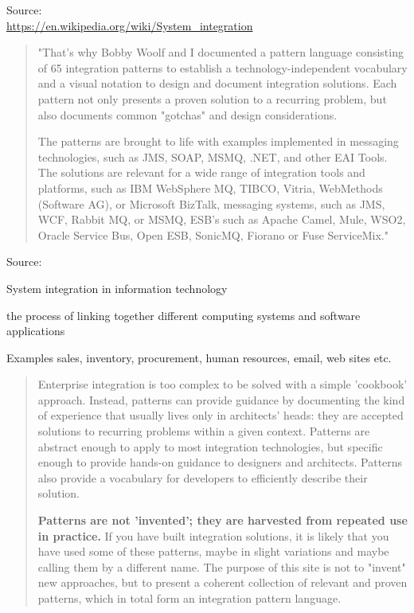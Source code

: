 \documentclass[Screen16to9,17pt]{foils}
\begin{document}
Source:\\
\url{https://en.wikipedia.org/wiki/System_integration}



\begin{quote}
"That's why Bobby Woolf and I documented a pattern language consisting of 65 integration patterns to establish a technology-independent vocabulary and a visual notation to design and document integration solutions. Each pattern not only presents a proven solution to a recurring problem, but also documents common "gotchas" and design considerations.

The patterns are brought to life with examples implemented in messaging technologies, such as JMS, SOAP, MSMQ, .NET, and other EAI Tools. The solutions are relevant for a wide range of integration tools and platforms, such as IBM WebSphere MQ, TIBCO, Vitria, WebMethods (Software AG), or Microsoft BizTalk, messaging systems, such as JMS, WCF, Rabbit MQ, or MSMQ, ESB's such as Apache Camel, Mule, WSO2, Oracle Service Bus, Open ESB, SonicMQ, Fiorano or Fuse ServiceMix."
\end{quote}

Source:\\


\begin{list2}
\item System integration in information technology
\item the process of linking together different computing systems and software applications
\item Examples sales, inventory, procurement, human resources, email, web sites etc.
\end{list2}



\begin{quote}
Enterprise integration is too complex to be solved with a simple 'cookbook' approach. Instead, patterns can provide guidance by documenting the kind of experience that usually lives only in architects' heads: they are accepted solutions to recurring problems within a given context. Patterns are abstract enough to apply to most integration technologies, but specific enough to provide hands-on guidance to designers and architects. Patterns also provide a vocabulary for developers to efficiently describe their solution.

{\bf
Patterns are not 'invented'; they are harvested from repeated use in practice.} If you have built integration solutions, it is likely that you have used some of these patterns, maybe in slight variations and maybe calling them by a different name. The purpose of this site is not to "invent" new approaches, but to present a coherent collection of relevant and proven patterns, which in total form an integration pattern language.
\end{quote}
\end{document}

